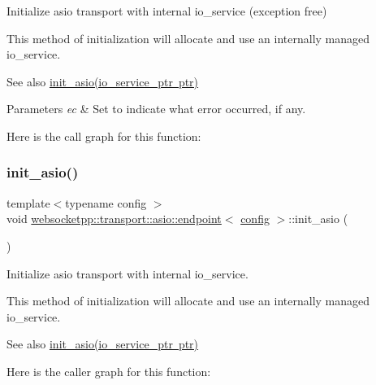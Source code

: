 Initialize asio transport with internal io\+\_\+service (exception free) 

This method of initialization will allocate and use an internally managed io\+\_\+service.

\begin{DoxySeeAlso}{See also}
\mbox{\hyperlink{classwebsocketpp_1_1transport_1_1asio_1_1endpoint_a320fc4ea3a151afaf8b973ce32effd25}{init\+\_\+asio(io\+\_\+service\+\_\+ptr ptr)}}
\end{DoxySeeAlso}

\begin{DoxyParams}{Parameters}
{\em ec} & Set to indicate what error occurred, if any. \\
\hline
\end{DoxyParams}
Here is the call graph for this function\+:
\mbox{\label{classwebsocketpp_1_1transport_1_1asio_1_1endpoint_a22938eec899a9ab2b9ada2b76172f798}} 
\subsubsection{\texorpdfstring{init\+\_\+asio()}{init\_asio()}\hspace{0.1cm}{\footnotesize\ttfamily [4/4]}}
{\footnotesize\ttfamily template$<$typename config $>$ \\
void \mbox{\hyperlink{classwebsocketpp_1_1transport_1_1asio_1_1endpoint}{websocketpp\+::transport\+::asio\+::endpoint}}$<$ \mbox{\hyperlink{classconfig}{config}} $>$\+::init\+\_\+asio (\begin{DoxyParamCaption}{ }\end{DoxyParamCaption})\hspace{0.3cm}{\ttfamily [inline]}}



Initialize asio transport with internal io\+\_\+service. 

This method of initialization will allocate and use an internally managed io\+\_\+service.

\begin{DoxySeeAlso}{See also}
\mbox{\hyperlink{classwebsocketpp_1_1transport_1_1asio_1_1endpoint_a320fc4ea3a151afaf8b973ce32effd25}{init\+\_\+asio(io\+\_\+service\+\_\+ptr ptr)}} 
\end{DoxySeeAlso}
Here is the caller graph for this function\+:
\mbox{\label{classwebsocketpp_1_1transport_1_1asio_1_1endpoint_a26ad1ad26277ed99a691559e69d47932}} 
